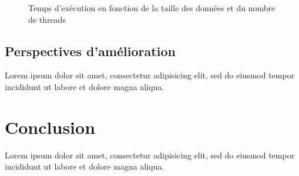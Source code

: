 \documentclass[12pt]{article}
\begin{document}
\begin{figure}
    \begin{center}
        \caption{Temps d'exécution en fonction de la taille des données et du nombre de threads}
        \label{time-to-data-size-and-threads}
    \end{center}
\end{figure}

\subsection{Perspectives d'amélioration}
    
Lorem ipsum dolor sit amet, consectetur adipisicing elit, sed do eiusmod tempor
incididunt ut labore et dolore magna aliqua.

\section{Conclusion}

Lorem ipsum dolor sit amet, consectetur adipisicing elit, sed do eiusmod tempor
incididunt ut labore et dolore magna aliqua.
\end{document}
